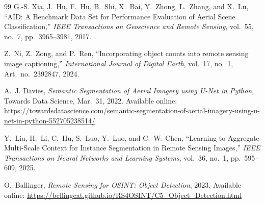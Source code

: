 \documentclass[
    11pt,
    a4paper,
    parskip=half,
    bibliography=totoc,
    numbers=noenddot
]{scrartcl}
\begin{document}
\begin{thebibliography}{99}
G.-S. Xia, J.~Hu, F.~Hu, B.~Shi, X.~Bai, Y.~Zhong, L.~Zhang,
and X.~Lu,
``AID: A Benchmark Data Set for Performance Evaluation of Aerial
Scene Classification,''
\textit{IEEE Transactions on Geoscience and Remote Sensing},
vol.~55, no.~7, pp.~3965--3981, 2017.

Z.~Ni, Z.~Zong, and P.~Ren,
``Incorporating object counts into remote sensing image captioning,''
\textit{International Journal of Digital Earth},
vol.~17, no.~1, Art.~no.~2392847, 2024.

A.~J. Davies,
\textit{Semantic Segmentation of Aerial Imagery using U-Net in Python},
Towards Data Science, Mar.~31, 2022.
Available online:
\url{https://towardsdatascience.com/semantic-segmentation-of-aerial-imagery-using-u-net-in-python-552705238514/}

Y.~Liu, H.~Li, C.~Hu, S.~Luo, Y.~Luo, and C.~W. Chen,
``Learning to Aggregate Multi-Scale Context for Instance Segmentation
in Remote Sensing Images,''
\textit{IEEE Transactions on Neural Networks and Learning Systems},
vol.~36, no.~1, pp.~595--609, 2025.

O.~Ballinger,
\textit{Remote Sensing for OSINT: Object Detection},
2023.
Available online:
\url{https://bellingcat.github.io/RS4OSINT/C5_Object_Detection.html}

\end{thebibliography}
\end{document}
